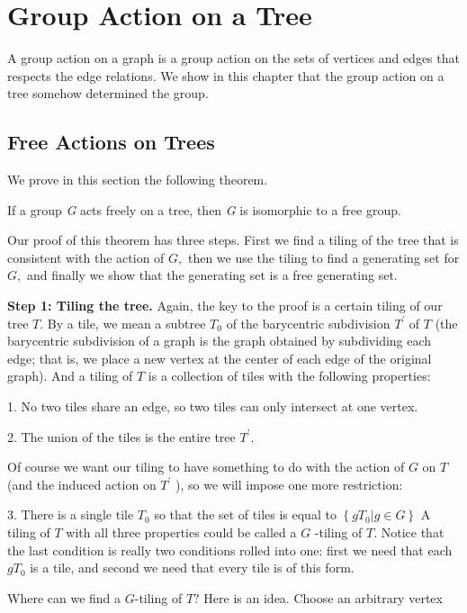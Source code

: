 \section{Group Action on a Tree}
\label{chap3}
A group action on a graph is a group action on the sets of vertices and edges that respects the edge
relations. We show in this chapter that the group action on a tree somehow determined the group.

\subsection{Free Actions on Trees}
We prove in this section the following theorem.
\begin{theorem}
\label{3.1}
If a group \textit{G} acts freely on a tree, then \textit{G} is isomorphic to a free group.
\end{theorem}
Our proof of this theorem has three steps. First we find a tiling of the tree that is consistent with the action of $G,$ then we use the tiling to find a generating set for $G,$ and finally we show that the generating set is a free generating set.
\par\noindent
\textbf{Step 1: Tiling the tree. }Again, the key to the proof is a certain tiling of our tree
$T .$ By a tile, we mean a subtree $T_{0}$ of the barycentric subdivision $T^{\prime}$ of $T$ (the barycentric subdivision of a graph is the graph obtained by subdividing each edge; that is, we place a new vertex at the center of each edge of the original graph). And a tiling of $T$ is a collection of tiles with the following properties:
\par
 1. No two tiles share an edge, so two tiles can only intersect at one vertex.
 \par
 2. The union of the tiles is the entire tree $T^{\prime}$.
 \par\noindent
Of course we want our tiling to have something to do with the action of $G$ on $T$ (and the induced action on $T^{\prime}$ ), so we will impose one more restriction:\par
3. There is a single tile $T_{0}$ so that the set of tiles is equal to $\left\{g T_{0} | g \in G\right\}$
A tiling of $T$ with all three properties could be called a $G$ -tiling of $T .$ Notice that the last condition is really two conditions rolled into one: first we need that each $g T_{0}$ is a tile, and second we need that every tile is of this form.
\par
Where can we find a $G$-tiling of $T ?$ Here is an idea. Choose an arbitrary vertex
